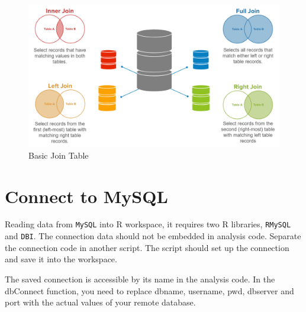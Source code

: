 \documentclass[
]{book}
\begin{document}
\begin{figure}

{\centering \includegraphics[width=1\linewidth]{./images/Bab5/jointable} 

}

\caption{Basic Join Table}\label{fig:jointable}
\end{figure}

\hypertarget{connect-to-mysql}{%
\section{Connect to MySQL}\label{connect-to-mysql}}

Reading data from \texttt{MySQL} into R workspace, it requires two R libraries, \texttt{RMySQL} and \texttt{DBI}. The connection data should not be embedded in analysis code. Separate the connection code in another script. The script should set up the connection and save it into the workspace.

The saved connection is accessible by its name in the analysis code. In the dbConnect function, you need to replace dbname, username, pwd, dbserver and port with the actual values of your remote database.
\end{document}

